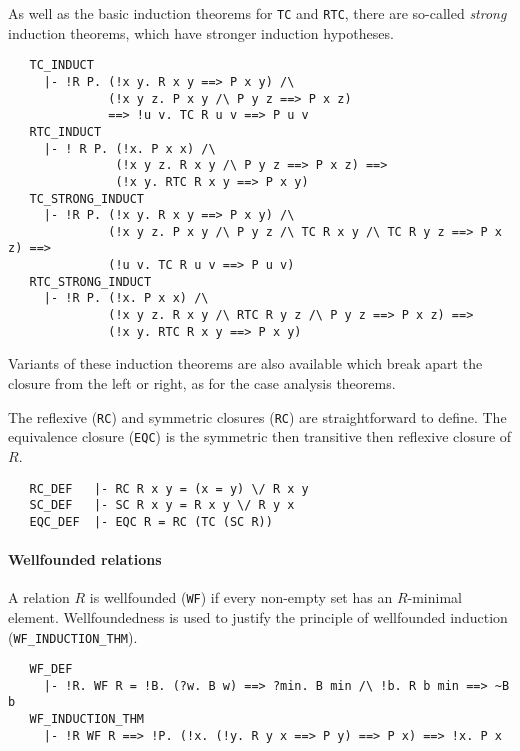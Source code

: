As well as the basic induction theorems for {\small\verb+TC+} and
{\small\verb+RTC+}, there are so-called \emph{strong} induction
theorems, which have stronger induction hypotheses.
%
\begin{hol}
\begin{verbatim}
   TC_INDUCT
     |- !R P. (!x y. R x y ==> P x y) /\
              (!x y z. P x y /\ P y z ==> P x z)
              ==> !u v. TC R u v ==> P u v
   RTC_INDUCT
     |- ! R P. (!x. P x x) /\
               (!x y z. R x y /\ P y z ==> P x z) ==>
               (!x y. RTC R x y ==> P x y)
   TC_STRONG_INDUCT
     |- !R P. (!x y. R x y ==> P x y) /\
              (!x y z. P x y /\ P y z /\ TC R x y /\ TC R y z ==> P x z) ==>
              (!u v. TC R u v ==> P u v)
   RTC_STRONG_INDUCT
     |- !R P. (!x. P x x) /\
              (!x y z. R x y /\ RTC R y z /\ P y z ==> P x z) ==>
              (!x y. RTC R x y ==> P x y)
\end{verbatim}
\end{hol}
Variants of these induction theorems are also available which break
apart the closure from the left or right, as for the case analysis theorems.

\medskip

The reflexive ({\small\verb+RC+}) and symmetric closures
({\small\verb+RC+}) are straightforward to define. The equivalence
closure ({\small\verb+EQC+}) is the symmetric then transitive then
reflexive closure of $R$.
%
\begin{hol}
\begin{verbatim}
   RC_DEF   |- RC R x y = (x = y) \/ R x y
   SC_DEF   |- SC R x y = R x y \/ R y x
   EQC_DEF  |- EQC R = RC (TC (SC R))
\end{verbatim}
\end{hol}

\paragraph {Wellfounded relations}

A relation $R$ is wellfounded ({\small\verb+WF+}) if every non-empty set
has an $R$-minimal element. Wellfoundedness is used to justify the
principle of wellfounded induction ({\small\verb+WF_INDUCTION_THM+}).
%
\begin{hol}
\begin{verbatim}
   WF_DEF
     |- !R. WF R = !B. (?w. B w) ==> ?min. B min /\ !b. R b min ==> ~B b
   WF_INDUCTION_THM
     |- !R WF R ==> !P. (!x. (!y. R y x ==> P y) ==> P x) ==> !x. P x
\end{verbatim}
\end{hol}

